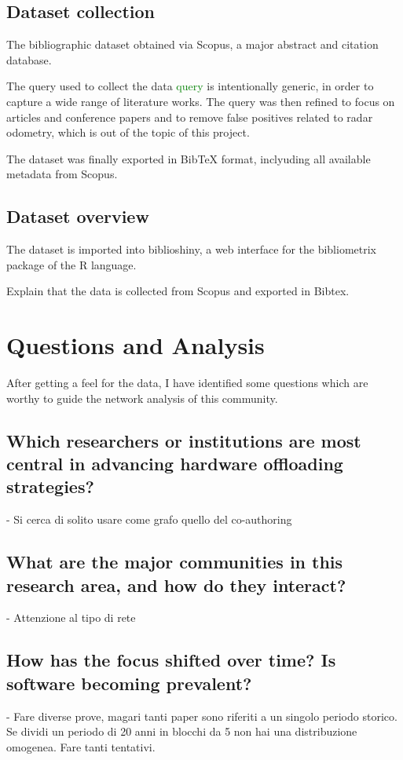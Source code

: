 \documentclass{article}
\begin{document}
\subsection{Dataset collection}
The bibliographic dataset obtained via Scopus, a major abstract and citation database.

The query used to collect the data \textcolor{green}{query} is intentionally generic, in order to capture a wide range of literature works. The query was then refined to focus on articles and conference papers and to remove false positives related to radar odometry, which is out of the topic of this project.

The dataset was finally exported in BibTeX format, inclyuding all available metadata from Scopus.

\subsection{Dataset overview}
The dataset is imported into biblioshiny\cite{biblioshiny}, a web interface for the bibliometrix\cite{bibliometrix} package of the R language.

Explain that the data is collected from Scopus and exported in Bibtex.


\section{Questions and Analysis}
After getting a feel for the data, I have identified some questions which are worthy to guide the network analysis of this community.
\subsection{Which researchers or institutions are most central in advancing hardware offloading strategies?}
    - Si cerca di solito usare come grafo quello del co-authoring
\subsection{What are the major communities in this research area, and how do they interact?}
    - Attenzione al tipo di rete
\subsection{How has the focus shifted over time? Is software becoming prevalent?}
    - Fare diverse prove, magari tanti paper sono riferiti a un singolo periodo storico. Se dividi un periodo di 20 anni in blocchi da 5 non hai una distribuzione omogenea. Fare tanti tentativi.
\end{document}

